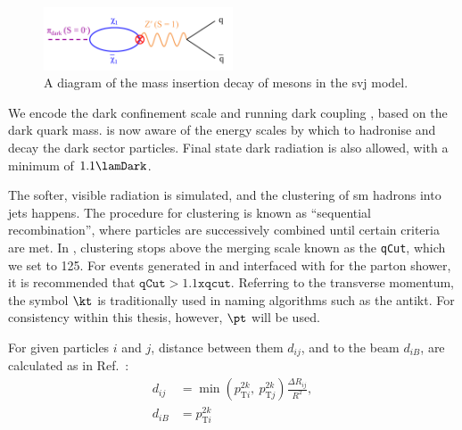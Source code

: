 
\begin{figure}[htbp]
    \centering
    \includegraphics[width=0.5\textwidth]{figures/mass_insertion_diagram.pdf}
    \caption[A diagram of the mass insertion decay of \Ppidark mesons in the \schannel semi-visible jet model]{A diagram of the mass insertion decay of \Ppidark mesons in the \schannel \gls{svj} model.}
    \label{fig:svj_mass_insertion}
\end{figure}

We encode the dark confinement scale \lamDark and running dark coupling \aDark, based on the dark quark mass. \PYTHIA is now aware of the energy scales by which to hadronise and decay the dark sector particles. Final state dark radiation is also allowed, with a minimum \pt of $\text{1.1}\lamDark$.


The softer, visible radiation is simulated, and the clustering of \acrshort{sm} hadrons into \glspl{jet} happens. The procedure for clustering is known as ``sequential recombination'', where particles are successively combined until certain criteria are met. In \PYTHIA, clustering stops above the merging scale known as the \texttt{qCut}, which we set to 125\GeV. For events generated in \MADGRAPH and interfaced with \PYTHIA for the parton shower, it is recommended that $\texttt{qCut} > 1.1 \texttt{xqcut}$. Referring to the transverse momentum, the symbol $\kt$ is traditionally used in naming algorithms such as the \gls{antikt}. For consistency within this thesis, however, $\pt$ will be used.

For given particles $i$ and $j$, distance between them $d_{ij}$, and to the beam $d_{iB}$, are calculated as in Ref.~:
\begin{equation}
    \begin{aligned}
d_{ij} &= \min(p_{\mathrm{T}i}^{2k}, \ p_{\mathrm{T}j}^{2k}) \frac{\Delta R_{ij}}{R^2},\\
d_{iB} &= p_{\mathrm{T}i}^{2k}
    \end{aligned}
    \label{eq:distances_kt_pythia}
\end{equation}

